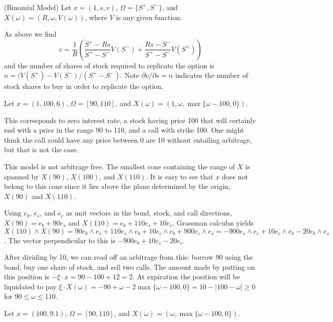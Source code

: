 \begin{example}{(Binomial Model)}
Let $x = (1, s, v)$, $\Omega = \{S^+, S^-\}$, and $X(\omega) = (R,
\omega, V(\omega))$, where $V$ is any given function.
\end{example}
As above we find
\begin{equation*}
	v = \frac{1}{R}\left(\frac{S^+ - Rs}{S^+ - S^-} V(S^-) 
		+ \frac{Rs - S^-}{S^+ - S^-} V(S^+)\right)
\end{equation*}
and the number of shares of stock required to replicate the option is
$n = (V(S^+) - V(S^-)/(S^+ - S^-)$. Note $\partial v/\partial s = n$
indicates the number of stock shares to buy in order to replicate
the option.

\begin{example}
Let $x = (1, 100, 6)$, $\Omega = [90,110]$,
and $X(\omega) = (1, \omega, \max\{\omega - 100, 0\})$.
\end{example}
This corresponds to
zero interest rate, a stock having price 100 that will certainly end with
a price in the range 90 to 110, and a call with strike 100. One might
think the call could have any price between 0 are 10 without entailing
arbitrage, but that is not the case.

This model is not arbitrage free.  The smallest cone containing the
range of $X$ is spanned by $X(90)$, $X(100)$, and $X(110)$. It is easy
to see that $x$ does not belong to this cone since it lies above the
plane determined by the origin, $X(90)$ and $X(110)$.

Using $e_b$, $e_s$, and $e_c$ as unit vectors in the bond, stock, and call
directions, $X(90) = e_b + 90e_s$ and $X(110) = e_b + 110e_s + 10e_c$.
Grassman calculus \cite{Pea1999} yields $X(110)\wedge X(90)
= 90 e_b\wedge e_s + 110e_s\wedge e_b + 10e_c\wedge e_b + 900e_c\wedge e_s
= -900e_s\wedge e_c + 10e_c\wedge e_b - 20e_b\wedge e_s$. The vector
perpendicular to this is $-900e_b + 10e_s - 20e_c$.

After dividing by 10, we can read off an arbitrage from this: borrow 90
using the bond, buy one share of stock, and sell two calls. The amount
made by putting on this position is $-\xi\cdot x = 90 - 100 + 12 = 2$. At
expiration the position will be liquidated to pay $\xi\cdot X(\omega)
= -90 + \omega - 2\max\{\omega - 100, 0\} = 10 - |100 - \omega| \ge 0$
for $90\le\omega\le 110$.

\begin{example}
Let $x = (100, 9.1)$, $\Omega = [90,110]$,
and $X(\omega) = (\omega, \max\{\omega - 100, 0\})$.
\end{example}

